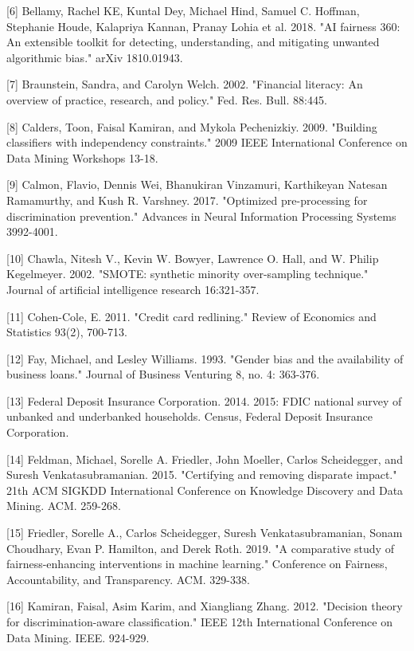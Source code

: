 \documentclass{article}
\begin{document}
[6] Bellamy, Rachel KE, Kuntal Dey, Michael Hind, Samuel C. Hoffman, Stephanie Houde, Kalapriya Kannan, Pranay Lohia et al. 2018. "AI fairness 360: An extensible toolkit for detecting, understanding, and mitigating unwanted algorithmic bias." arXiv 1810.01943.

[7] Braunstein, Sandra, and Carolyn Welch. 2002. "Financial literacy: An overview of practice, research, and policy." Fed. Res. Bull. 88:445.

[8] Calders, Toon, Faisal Kamiran, and Mykola Pechenizkiy. 2009. "Building classifiers with independency constraints." 2009 IEEE International Conference on Data Mining Workshops 13-18.

[9] Calmon, Flavio, Dennis Wei, Bhanukiran Vinzamuri, Karthikeyan Natesan Ramamurthy, and Kush R. Varshney. 2017. "Optimized pre-processing for discrimination prevention." Advances in Neural Information Processing Systems 3992-4001.

[10] Chawla, Nitesh V., Kevin W. Bowyer, Lawrence O. Hall, and W. Philip Kegelmeyer. 2002. "SMOTE: synthetic minority over-sampling technique." Journal of artificial intelligence research 16:321-357.

[11] Cohen-Cole, E. 2011. "Credit card redlining." Review of Economics and Statistics 93(2), 700-713.


[12] Fay, Michael, and Lesley Williams. 1993. "Gender bias and the availability of business loans." Journal of Business Venturing 8, no. 4: 363-376.

[13] Federal Deposit Insurance Corporation. 2014. 2015: FDIC national survey of unbanked and underbanked households. Census, Federal Deposit Insurance Corporation.

[14] Feldman, Michael, Sorelle A. Friedler, John Moeller, Carlos Scheidegger, and Suresh Venkatasubramanian. 2015. "Certifying and removing disparate impact." 21th ACM SIGKDD International Conference on Knowledge Discovery and Data Mining. ACM. 259-268.

[15] Friedler, Sorelle A., Carlos Scheidegger, Suresh Venkatasubramanian, Sonam Choudhary, Evan P. Hamilton, and Derek Roth. 2019. "A comparative study of fairness-enhancing interventions in machine learning." Conference on Fairness, Accountability, and Transparency. ACM. 329-338.

[16] Kamiran, Faisal, Asim Karim, and Xiangliang Zhang. 2012. "Decision theory for discrimination-aware classification." IEEE 12th International Conference on Data Mining. IEEE. 924-929.
\end{document}
